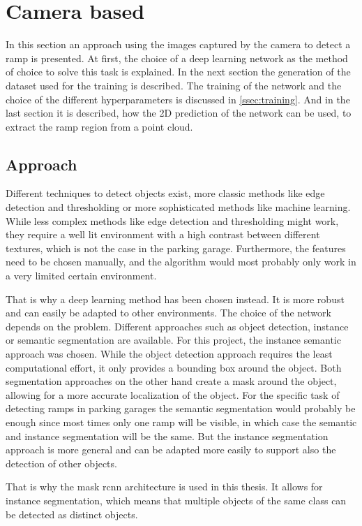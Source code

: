 \section{Camera based}
\label{sec:methods_camera}
In this section an approach using the images captured by the camera to detect a ramp is presented.
At first, the choice of a deep learning network as the method of choice to solve this task is explained.
In the next section the generation of the dataset used for the training is described.
The training of the network and the choice of the different hyperparameters is discussed in \cref{ssec:training}.
And in the last section it is described, how the 2D prediction of the network can be used, to extract the ramp region from a point cloud.

\subsection{Approach}
Different techniques to detect objects exist, more classic methods like edge detection and thresholding or more sophisticated methods like machine learning.
While less complex methods like edge detection and thresholding might work, they require a well lit environment with a high contrast between different textures, which is not the case in the parking garage.
Furthermore, the features need to be chosen manually, and the algorithm would most probably only work in a very limited certain environment.\par
That is why a deep learning method has been chosen instead.
It is more robust and can easily be adapted to other environments.
The choice of the network depends on the problem.
Different approaches such as object detection, instance or semantic segmentation are available.
For this project, the instance semantic approach was chosen.
While the object detection approach requires the least computational effort, it only provides a bounding box around the object.
Both segmentation approaches on the other hand create a mask around the object, allowing for a more accurate localization of the object.
For the specific task of detecting ramps in parking garages the semantic segmentation would probably be enough since most times only one ramp will be visible, in which case the semantic and instance segmentation will be the same.
But the instance segmentation approach is more general and can be adapted more easily to support also the detection of other objects.\par
That is why the mask \gls{rcnn} architecture is used in this thesis.
It allows for instance segmentation, which means that multiple objects of the same class can be detected as distinct objects.
